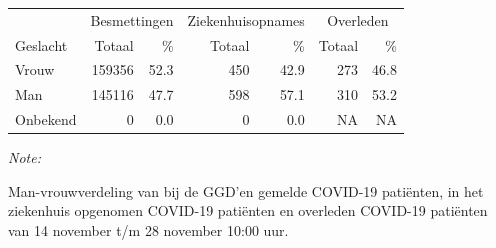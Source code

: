 \documentclass[
  english,
  man,floatsintext]{apa6}
\begin{document}
\begin{table}
\centering\begingroup\fontsize{11}{13}\selectfont

\begin{threeparttable}
\begin{tabular}{lrrrrrr}
\toprule
\multicolumn{1}{c}{ } & \multicolumn{2}{c}{Besmettingen} & \multicolumn{2}{c}{Ziekenhuisopnames} & \multicolumn{2}{c}{Overleden} \\
\cmidrule(l{3pt}r{3pt}){2-3} \cmidrule(l{3pt}r{3pt}){4-5} \cmidrule(l{3pt}r{3pt}){6-7}
Geslacht & Totaal & \% & Totaal & \% & Totaal & \%\\
\midrule
Vrouw & 159356 & 52.3 & 450 & 42.9 & 273 & 46.8\\
Man & 145116 & 47.7 & 598 & 57.1 & 310 & 53.2\\
Onbekend & 0 & 0.0 & 0 & 0.0 & NA & NA\\
\bottomrule
\end{tabular}
\begin{tablenotes}
\item \textit{Note: } 
\item Man-vrouwverdeling van bij de GGD’en gemelde COVID-19 patiënten, in het ziekenhuis opgenomen COVID-19 patiënten en overleden COVID-19 patiënten van 14 november t/m 28 november 10:00 uur.
\end{tablenotes}
\end{threeparttable}
\endgroup{}
\end{table}
\newpage
\end{document}
